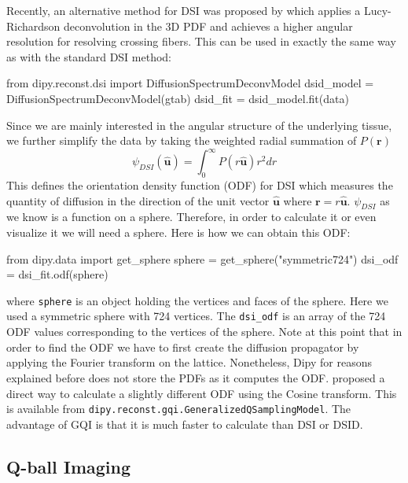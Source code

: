 \documentclass{bioinfo}
\begin{document}
Recently, an alternative method for DSI was proposed by \citep{canales-rodriguez-etal:10} which applies a Lucy-Richardson deconvolution in the 3D PDF and achieves a higher angular resolution for resolving crossing fibers. This can be used in exactly the same way as with the standard DSI method:
\begin{python}
from dipy.reconst.dsi import
                      DiffusionSpectrumDeconvModel
dsid_model = DiffusionSpectrumDeconvModel(gtab)
dsid_fit = dsid_model.fit(data)
\end{python}
Since we are mainly interested in the angular structure of the underlying tissue, we further simplify the data by taking the weighted radial summation of $P(\mathbf{r})$
\begin{equation}
\psi_{DSI}(\hat{\mathbf{u}})=\int_{0}^{\infty}P(r\hat{\mathbf{u}})r^{2}dr\label{eq:ODF_DSI}
\end{equation}
\noindent This defines the orientation density function (ODF) for DSI which measures the quantity of diffusion in the direction of the unit vector $\mathbf{\hat{u}}$ where $\mathbf{r=}r\hat{\mathbf{u}}$. $\psi_{DSI}$ as we know is a function on a sphere. Therefore, in order to calculate it or even visualize it we will need a sphere. Here is how we can obtain this ODF:
\begin{python}
from dipy.data import get_sphere
sphere = get_sphere("symmetric724")
dsi_odf = dsi_fit.odf(sphere)
\end{python}
where \texttt{sphere} is an object holding the vertices and faces of the sphere. Here we used a symmetric sphere with 724 vertices. The \texttt{dsi\_odf} is an array of the 724 ODF values corresponding to the vertices of the sphere. Note at this point that in order to find the ODF we have to first create the diffusion propagator by applying the Fourier transform on the lattice. Nonetheless, Dipy for reasons explained before does not store the PDFs as it computes the ODF. \cite{yeh-etal:10} proposed a direct way to calculate a slightly different ODF using the Cosine transform. This is available from \texttt{dipy.reconst.gqi.GeneralizedQSamplingModel}. The advantage of GQI is that it is much faster to calculate than DSI or DSID.

\subsection{Q-ball Imaging}
\end{document}
